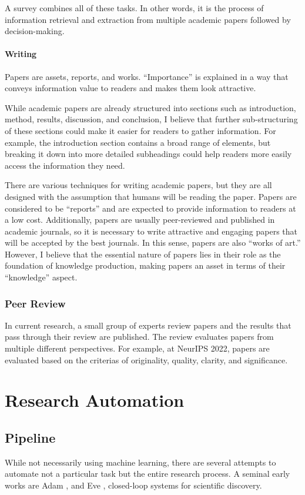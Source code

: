 \documentclass{book}
\begin{document}
A survey combines all of these tasks. In other words, it is the process of information retrieval and extraction from multiple academic papers followed by decision-making.
\subsubsection{Writing}

Papers are assets, reports, and works.
``Importance'' is explained in a way that conveys information value to readers and makes them look attractive.

While academic papers are already structured into sections such as introduction, method, results, discussion, and conclusion, I believe that further sub-structuring of these sections could make it easier for readers to gather information. For example, the introduction section contains a broad range of elements, but breaking it down into more detailed subheadings could help readers more easily access the information they need.

There are various techniques for writing academic papers, but they are all designed with the assumption that humans will be reading the paper. Papers are considered to be ``reports'' and are expected to provide information to readers at a low cost. Additionally, papers are usually peer-reviewed and published in academic journals, so it is necessary to write attractive and engaging papers that will be accepted by the best journals. In this sense, papers are also ``works of art.'' However, I believe that the essential nature of papers lies in their role as the foundation of knowledge production, making papers an asset in terms of their ``knowledge'' aspect.

\subsection{Peer Review}
In current research, a small group of experts review papers and the results that pass through their review are published. The review evaluates papers from multiple different perspectives. For example, at NeurIPS 2022, papers are evaluated based on the criterias of originality, quality, clarity, and significance.


\chapter{Research Automation}

\section{Pipeline}
While not necessarily using machine learning, there are several attempts to automate not a particular task but the entire research process. A seminal early works are Adam \cite{king2004functional}, and Eve \cite{williams2015cheaper}, closed-loop systems for scientific discovery. 
\end{document}
